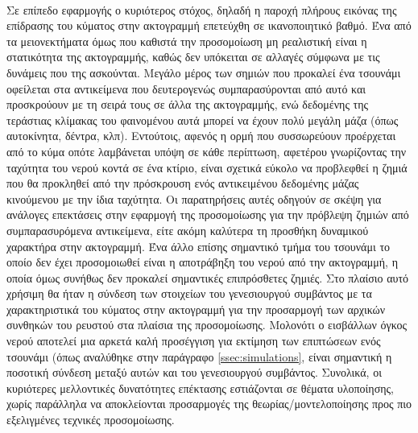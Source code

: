 \paragraph{} Σε επίπεδο εφαρμογής ο κυριότερος στόχος, δηλαδή η παροχή πλήρους εικόνας της
επίδρασης του κύματος στην ακτογραμμή επετεύχθη σε ικανοποιητικό βαθμό. Ένα από τα
μειονεκτήματα όμως που καθιστά την προσομοίωση μη ρεαλιστική είναι η στατικότητα της
ακτογραμμής, καθώς δεν υπόκειται σε αλλαγές σύμφωνα με τις δυνάμεις που της
ασκούνται. Μεγάλο μέρος των σημιών που προκαλεί ένα τσουνάμι οφείλεται στα αντικείμενα που
δευτερογενώς συμπαρασύρονται από αυτό και προσκρούουν με τη σειρά τους σε άλλα της
ακτογραμμής, ενώ δεδομένης της τεράστιας κλίμακας του φαινομένου αυτά μπορεί να έχουν πολύ
μεγάλη μάζα (όπως αυτοκίνητα, δέντρα, κλπ). Εντούτοις, αφενός η ορμή που συσσωρεύουν
προέρχεται από το κύμα οπότε λαμβάνεται υπόψη σε κάθε περίπτωση, αφετέρου γνωρίζοντας την
ταχύτητα του νερού κοντά σε ένα κτίριο, είναι σχετικά εύκολο να προβλεφθεί η ζημιά που θα
προκληθεί από την πρόσκρουση ενός αντικειμένου δεδομένης μάζας κινούμενου με την ίδια
ταχύτητα. Οι παρατηρήσεις αυτές οδηγούν σε σκέψη για ανάλογες επεκτάσεις στην εφαρμογή της
προσομοίωσης για την πρόβλεψη ζημιών από συμπαρασυρόμενα αντικείμενα, είτε ακόμη καλύτερα
τη προσθήκη δυναμικού χαρακτήρα στην ακτογραμμή. Ένα άλλο επίσης σημαντικό τμήμα του
τσουνάμι το οποίο δεν έχει προσομοιωθεί είναι η αποτράβηξη του νερού από την ακτογραμμή, η
οποία όμως συνήθως δεν προκαλεί σημαντικές επιπρόσθετες ζημιές. Στο πλαίσιο αυτό χρήσιμη
θα ήταν η σύνδεση των στοιχείων του γενεσιουργού συμβάντος με τα χαρακτηριστικά του
κύματος στην ακτογραμμή για την προσαρμογή των αρχικών συνθηκών του ρευστού στα πλαίσια
της προσομοίωσης. Μολονότι ο εισβάλλων όγκος νερού αποτελεί μια αρκετά καλή προσέγγιση για
εκτίμηση των επιπτώσεων ενός τσουνάμι (όπως αναλύθηκε στην παράγραφο
\ref{ssec:simulations}, είναι σημαντική η ποσοτική σύνδεση μεταξύ αυτών και του
γενεσιουργού συμβάντος. Συνολικά, οι κυριότερες μελλοντικές δυνατότητες επέκτασης
εστιάζονται σε θέματα υλοποίησης, χωρίς παράλληλα να αποκλείονται προσαρμογές της
θεωρίας/μοντελοποίησης προς πιο εξελιγμένες τεχνικές προσομοίωσης.


